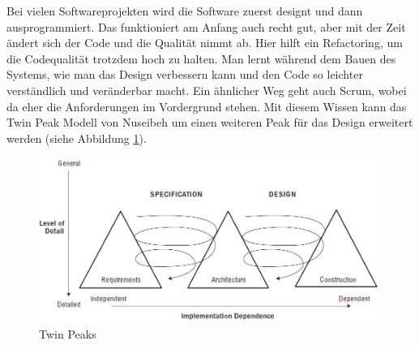 Bei vielen Softwareprojekten wird die Software zuerst designt und dann ausprogrammiert. Das funktioniert am Anfang auch recht gut, aber mit der Zeit ändert sich der Code und die Qualität nimmt ab. Hier hilft ein Refactoring, um die Codequalität trotzdem hoch zu halten. Man lernt während dem Bauen des Systems, wie man das Design verbessern kann und den Code so leichter verständlich und veränderbar macht. Ein ähnlicher Weg geht auch Scrum, wobei da eher die Anforderungen im Vordergrund stehen. Mit diesem Wissen kann das Twin Peak Modell von Nuseibeh um einen weiteren Peak für das Design erweitert werden (siehe Abbildung \ref{fig:twin-peaks-1}).

\begin{figure}[h!]
\centering
\includegraphics[width=0.7\linewidth]{fig/twin-peaks}
\caption{Twin Peaks}
\label{fig:twin-peaks-1}
\end{figure}

